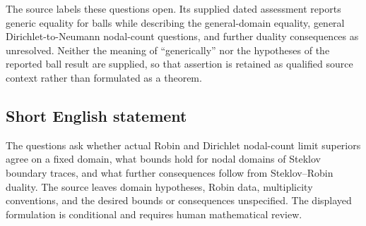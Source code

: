 \documentclass[11pt]{article}
\begin{document}
The source labels these questions open. Its supplied dated assessment reports generic equality for balls while describing the general-domain equality, general Dirichlet-to-Neumann nodal-count questions, and further duality consequences as unresolved. Neither the meaning of ``generically'' nor the hypotheses of the reported ball result are supplied, so that assertion is retained as qualified source context rather than formulated as a theorem.
\subsection{Short English statement}
The questions ask whether actual Robin and Dirichlet nodal-count limit superiors agree on a fixed domain, what bounds hold for nodal domains of Steklov boundary traces, and what further consequences follow from Steklov--Robin duality. The source leaves domain hypotheses, Robin data, multiplicity conventions, and the desired bounds or consequences unspecified. The displayed formulation is conditional and requires human mathematical review.
\end{document}

